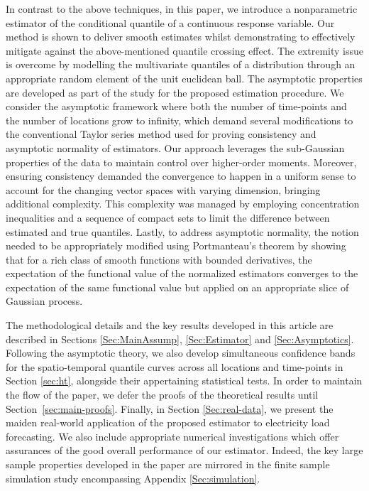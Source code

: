 \documentclass[aos]{imsart}
\theoremstyle{plain}
\theoremstyle{remark}
\begin{document}
In contrast to the above techniques, in this paper, we introduce a nonparametric estimator of the conditional quantile of a continuous response variable. Our method is shown to deliver smooth estimates whilst demonstrating to effectively mitigate against the above-mentioned quantile crossing effect. The extremity issue is overcome by modelling the multivariate quantiles of a distribution through an appropriate random element of the unit euclidean ball. The asymptotic properties are developed as part of the study for the proposed estimation procedure. We consider the asymptotic framework where both the number of time-points and the number of locations grow to infinity, which demand several modifications to the conventional Taylor series method used for proving consistency and asymptotic normality of estimators. Our approach leverages the sub-Gaussian properties of the data to maintain control over higher-order moments. Moreover, ensuring consistency demanded the convergence to happen in a uniform sense to account for the changing vector spaces with varying dimension, bringing additional complexity. This complexity was managed by employing concentration inequalities and a sequence of compact sets to limit the difference between estimated and true quantiles. Lastly, to address asymptotic normality, the notion needed to be appropriately modified using Portmanteau's theorem by showing that for a rich class of smooth functions with bounded derivatives, the expectation of the functional value of the normalized estimators converges to the expectation of the same functional value but applied on an appropriate slice of Gaussian process. 

The methodological details and the key results developed in this article are described in Sections \ref{Sec:MainAssump}, \ref{Sec:Estimator} and \ref{Sec:Asymptotics}. Following the asymptotic theory, we also develop simultaneous confidence bands for the spatio-temporal quantile curves across all locations and time-points in Section \ref{sec:ht}, alongside their appertaining statistical tests. In order to maintain the flow of the paper, we defer the proofs of the theoretical results until Section~\ref{sec:main-proofs}. Finally, in Section \ref{Sec:real-data}, we present the maiden real-world application of the proposed estimator to electricity load forecasting. We also include appropriate numerical investigations which offer assurances of the good overall performance of our estimator. Indeed, the key large sample properties developed in the paper are mirrored in the finite sample simulation study encompassing Appendix \ref{Sec:simulation}. 
\end{document}
